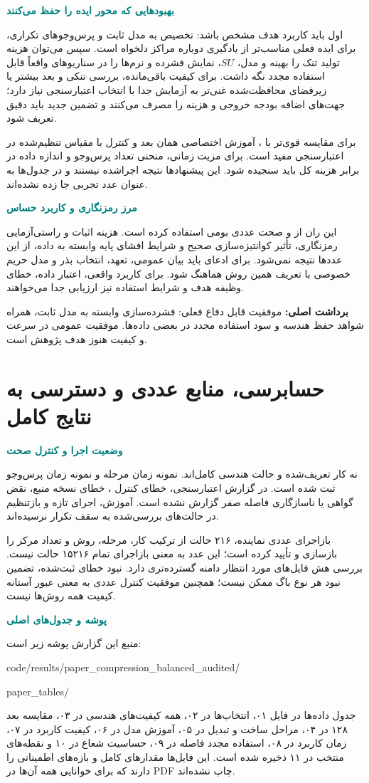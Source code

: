 \documentclass[11pt,a4paper]{article}
\newcommand{\lesson}[1]{\clearpage\section{#1}}
\newcommand{\key}[1]{\par\vspace{4pt}\noindent\colorbox{pale}{\parbox{\dimexpr\textwidth-2\fboxsep\relax}{\textbf{برداشت اصلی:} #1}}\par\vspace{3pt}}
\newcommand{\sub}[1]{\par\vspace{3pt}\textbf{\textcolor{teal}{#1}}\par}
\begin{document}
\sub{بهبودهایی که محور ایده را حفظ می‌کنند}
اول باید کاربرد هدف مشخص باشد: تخصیص به مدل ثابت و پرس‌وجوهای تکراری، برای ایده فعلی مناسب‌تر از یادگیری دوباره مراکز دلخواه است. سپس می‌توان هزینه تولید تنک را بهینه و مدل، \(SU\)، نمایش فشرده و نرم‌ها را در سناریوهای واقعاً قابل استفاده مجدد نگه داشت. برای کیفیت باقی‌مانده، بررسی تنکی و بعد بیشتر یا زیرفضای محافظت‌شده غنی‌تر به آزمایش جدا با انتخاب اعتبارسنجی نیاز دارد؛ جهت‌های اضافه بودجه خروجی و هزینه را مصرف می‌کنند و تضمین جدید باید دقیق تعریف شود.

برای مقایسه قوی‌تر با ، آموزش اختصاصی همان بعد و کنترل  با مقیاس تنظیم‌شده در اعتبارسنجی مفید است. برای مزیت زمانی، منحنی تعداد پرس‌وجو و اندازه داده در برابر هزینه کل باید سنجیده شود. این پیشنهادها نتیجه اجراشده نیستند و در جدول‌ها به عنوان عدد تجربی جا زده نشده‌اند.

\sub{مرز رمزنگاری و کاربرد حساس}
این ران از  و صحت عددی بومی استفاده کرده است. هزینه اثبات و راستی‌آزمایی رمزنگاری، تأثیر کوانتیزه‌سازی صحیح و شرایط افشای پایه وابسته به داده، از این عددها نتیجه نمی‌شود. برای ادعای  باید بیان عمومی، تعهد، انتخاب بذر و مدل حریم خصوصی با تعریف همین روش هماهنگ شود. برای کاربرد واقعی، اعتبار داده، خطای وظیفه هدف و شرایط استفاده نیز ارزیابی جدا می‌خواهند.
\key{موفقیت قابل دفاع فعلی: فشرده‌سازی وابسته به مدل ثابت، همراه شواهد حفظ هندسه و سود استفاده مجدد در بعضی داده‌ها. موفقیت عمومی در سرعت و کیفیت هنوز هدف پژوهش است.}

\lesson{حسابرسی، منابع عددی و دسترسی به نتایج کامل}
\sub{وضعیت اجرا و کنترل صحت}
نه کار تعریف‌شده و  حالت هندسی کامل‌اند.  نمونه زمان مرحله و  نمونه زمان پرس‌وجو ثبت شده است. در گزارش اعتبارسنجی، خطای کنترل ، خطای نسخه منبع، نقض گواهی یا ناسازگاری فاصله صفر گزارش نشده است.  آموزش، اجرای تازه و بازتنظیم در حالت‌های بررسی‌شده به سقف تکرار نرسیده‌اند.

بازاجرای عددی نماینده، ۲۱۶ حالت از ترکیب کار، مرحله، روش و تعداد مرکز را بازسازی و تأیید کرده است؛ این عدد به معنی بازاجرای تمام ۱۵۲۱۶ حالت نیست. بررسی هش فایل‌های مورد انتظار دامنه گسترده‌تری دارد. نبود خطای ثبت‌شده، تضمین نبود هر نوع باگ ممکن نیست؛ همچنین موفقیت کنترل عددی به معنی عبور آستانه کیفیت همه روش‌ها نیست.

\sub{پوشه و جدول‌های اصلی}
منبع این گزارش پوشه زیر است:
\begin{latin}\small\ttfamily
code/results/paper\_compression\_balanced\_audited/\par
paper\_tables/
\end{latin}
جدول داده‌ها در فایل ۰۱، انتخاب‌ها در ۰۲، همه کیفیت‌های هندسی در ۰۳، مقایسه بعد ۱۲۸ در ۰۴، مراحل ساخت و تبدیل در ۰۵، آموزش مدل در ۰۶، کیفیت کاربرد در ۰۷، زمان کاربرد در ۰۸، استفاده مجدد فاصله در ۰۹، حساسیت شعاع در ۱۰ و نقطه‌های منتخب در ۱۱ ذخیره شده است. این فایل‌ها مقدارهای کامل و بازه‌های اطمینانی را دارند که برای خوانایی همه آن‌ها در PDF چاپ نشده‌اند.
\end{document}

